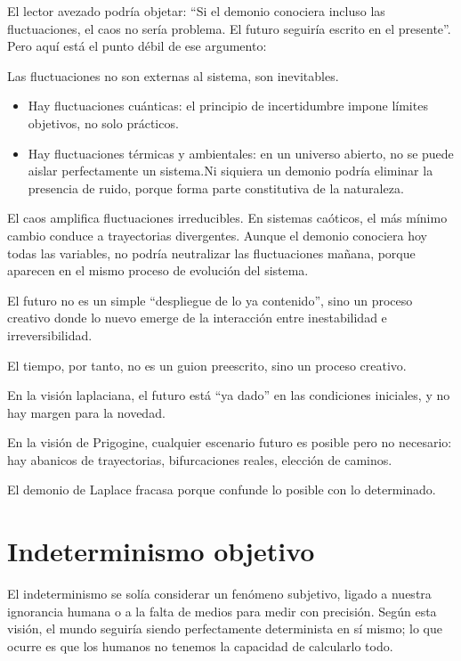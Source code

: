 \documentclass[
  11pt,
  a4paper,
  DIV=11,
  numbers=noendperiod]{scrreprt}
\begin{document}
El lector avezado podría objetar: ``Si el demonio conociera incluso las
fluctuaciones, el caos no sería problema. El futuro seguiría escrito en
el presente''. Pero aquí está el punto débil de ese argumento:

Las fluctuaciones no son externas al sistema, son inevitables.

\begin{itemize}
\item
  Hay fluctuaciones cuánticas: el principio de incertidumbre impone
  límites objetivos, no solo prácticos.
\item
  Hay fluctuaciones térmicas y ambientales: en un universo abierto, no
  se puede aislar perfectamente un sistema.Ni siquiera un demonio podría
  eliminar la presencia de ruido, porque forma parte constitutiva de la
  naturaleza.
\end{itemize}

El caos amplifica fluctuaciones irreducibles. En sistemas caóticos, el
más mínimo cambio conduce a trayectorias divergentes. Aunque el demonio
conociera hoy todas las variables, no podría neutralizar las
fluctuaciones mañana, porque aparecen en el mismo proceso de evolución
del sistema.

El futuro no es un simple ``despliegue de lo ya contenido'', sino un
proceso creativo donde lo nuevo emerge de la interacción entre
inestabilidad e irreversibilidad.

El tiempo, por tanto, no es un guion preescrito, sino un proceso
creativo.

En la visión laplaciana, el futuro está ``ya dado'' en las condiciones
iniciales, y no hay margen para la novedad.

En la visión de Prigogine, cualquier escenario futuro es posible pero no
necesario: hay abanicos de trayectorias, bifurcaciones reales, elección
de caminos.

El demonio de Laplace fracasa porque confunde lo posible con lo
determinado.

\chapter{Indeterminismo objetivo}\label{indeterminismo-objetivo}

El indeterminismo se solía considerar un fenómeno subjetivo, ligado a
nuestra ignorancia humana o a la falta de medios para medir con
precisión. Según esta visión, el mundo seguiría siendo perfectamente
determinista en sí mismo; lo que ocurre es que los humanos no tenemos la
capacidad de calcularlo todo.
\end{document}
